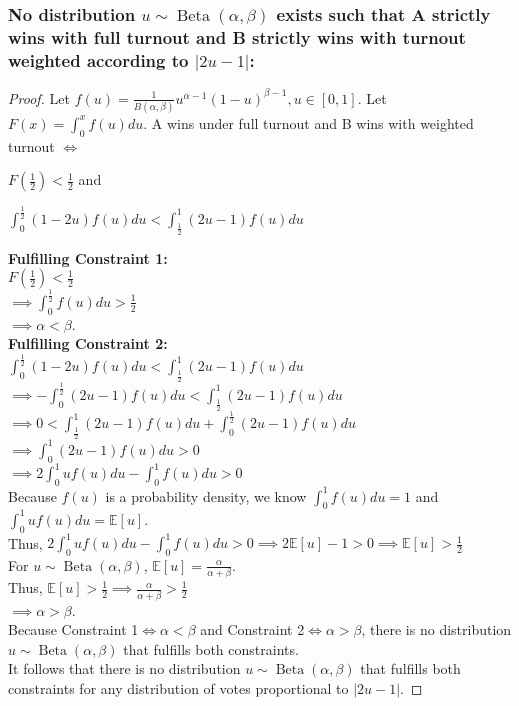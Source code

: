 \documentclass[12pt]{article}
\begin{document}
\subsubsection*{No distribution $u \sim \operatorname{Beta}(\alpha, \beta)$ exists such that A strictly wins with full turnout and B strictly wins with turnout weighted according to $\lvert 2u - 1 \rvert$:}

\begin{proof}
    \setlength{\baselineskip}{12pt}
    \setlength{\lineskip}{3.5pt}
    \setlength{\lineskiplimit}{2pt}
    Let $f(u) = \frac{1}{B(\alpha, \beta)}u^{\alpha-1}(1-u)^{\beta-1}, u \in [0, 1]$. Let $F(x) = \int_0^x f(u) du$. A wins under full turnout and B wins with weighted turnout $\iff$
\begin{description}[nolistsep]
    \item[\normalfont Constraint 1:] $F(\frac{1}{2}) < \frac{1}{2}$ and
    \item[\normalfont Constraint 2:] $\int_0^\frac{1}{2}(1-2u)f(u)du < \int_\frac{1}{2}^1(2u-1)f(u)du$
\end{description}
\textbf{Fulfilling Constraint 1:} \\
$F(\frac{1}{2}) < \frac{1}{2}$ \\
$\implies \int_0^{\frac{1}{2}} f(u) du > \frac{1}{2}$ \\ 
$\implies \alpha < \beta$. \\
\textbf{Fulfilling Constraint 2:} \\
$\int_0^\frac{1}{2}(1-2u)f(u)du < \int_\frac{1}{2}^1(2u-1)f(u)du$ \\
$ \implies - \int_0^\frac{1}{2}(2u-1)f(u)du < \int_\frac{1}{2}^1(2u-1)f(u)du$ \\
$ \implies 0 < \int_\frac{1}{2}^1(2u-1)f(u)du + \int_0^\frac{1}{2}(2u-1)f(u)du$ \\
$\implies \int_0^1(2u-1)f(u)du > 0$ \\
$\implies 2\int_0^1 uf(u)du - \int_0^1f(u)du > 0$ \\
Because $f(u)$ is a probability density, we know $\int_0^1f(u)du = 1$  and $\int_0^1uf(u)du = \mathbb{E}[u]$. \\
Thus, $2\int_0^1 uf(u)du - \int_0^1f(u)du > 0 \implies 2\mathbb{E}[u] - 1 > 0 \implies \mathbb{E}[u] > \frac{1}{2}$ \\
For $u \sim \operatorname{Beta}(\alpha, \beta)$, $\mathbb{E}[u] = \frac{\alpha}{\alpha + \beta}$. \\
Thus, $\mathbb{E}[u] > \frac{1}{2} \implies \frac{\alpha}{\alpha + \beta} > \frac{1}{2}$ \\
$\implies \alpha > \beta$. \\
Because Constraint 1$\iff \alpha < \beta$ and Constraint 2$\iff \alpha > \beta$, there is no distribution $u \sim \operatorname{Beta}(\alpha, \beta)$ that fulfills both constraints. \\
It follows that there is no distribution $u \sim \operatorname{Beta}(\alpha, \beta)$ that fulfills both constraints for any distribution of votes proportional to $\lvert 2u - 1 \rvert$.
\end{proof}
\end{document}
